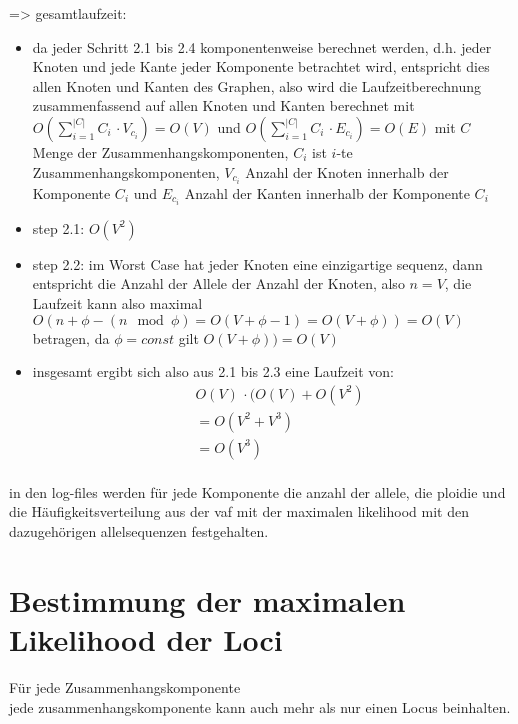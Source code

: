 => gesamtlaufzeit:\\
\begin{itemize}
	\item da jeder Schritt 2.1 bis 2.4 komponentenweise berechnet werden, d.h. jeder Knoten und jede Kante jeder Komponente betrachtet wird, entspricht dies allen Knoten und Kanten des Graphen, also wird die Laufzeitberechnung zusammenfassend auf allen Knoten und Kanten berechnet mit $O(\sum_{i=1}^{|C|} C_{i} \, \cdotp V_{c_{i}})=O(V) $ und $O(\sum_{i=1}^{|C|} C_{i} \, \cdotp E_{c_{i}})=O(E) $ mit $C$ Menge der Zusammenhangskomponenten, $C_{i}$ ist $i$-te Zusammenhangskomponenten, $V_{c_{i}}$ Anzahl der Knoten innerhalb der Komponente $C_{i}$ und $E_{c_{i}} $ Anzahl der Kanten innerhalb der Komponente  $C_{i}$
	\item step 2.1: $O(V^2)$\\
	\item step 2.2: im Worst Case hat jeder Knoten eine einzigartige sequenz, dann entspricht die Anzahl der Allele der Anzahl der Knoten, also $n = V$, die Laufzeit kann also maximal $O(n + \phi - (n \mod \phi) = O(V+\phi-1)= O(V+\phi)) = O(V)$ betragen, da $\phi = const$ gilt $ O(V+\phi)) = O(V) $
	\item insgesamt ergibt sich also aus 2.1 bis 2.3 eine Laufzeit von:\\
    \begin{equation} \label{eqn:3-xxx2}
	\tag{3-xxx2}
	\begin{aligned}
	&\ {} O(V) \, \cdotp (O(V) + O(V^2)\\
	&\ = O(V^2 + V^3) \\
	&\ = O(V^3)\\
	\end{aligned}
	\end{equation}
\end{itemize}

in den log-files werden für jede Komponente die anzahl der allele, die ploidie und die Häufigkeitsverteilung aus der vaf mit der maximalen likelihood mit den dazugehörigen allelsequenzen festgehalten.


\section{Bestimmung der maximalen Likelihood der Loci} \label{sec:max_lh_loci}
Für jede Zusammenhangskomponente\\
jede zusammenhangskomponente kann auch mehr als nur einen Locus beinhalten.\\
